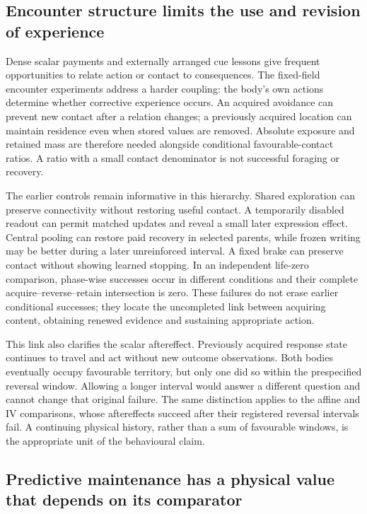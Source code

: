 \subsection*{Encounter structure limits the use and revision of experience}

Dense scalar payments and externally arranged cue lessons give frequent opportunities to relate action or contact to consequences. The fixed-field encounter experiments address a harder coupling: the body's own actions determine whether corrective experience occurs. An acquired avoidance can prevent new contact after a relation changes; a previously acquired location can maintain residence even when stored values are removed. Absolute exposure and retained mass are therefore needed alongside conditional favourable-contact ratios. A ratio with a small contact denominator is not successful foraging or recovery.

The earlier controls remain informative in this hierarchy. Shared exploration can preserve connectivity without restoring useful contact. A temporarily disabled readout can permit matched updates and reveal a small later expression effect. Central pooling can restore paid recovery in selected parents, while frozen writing may be better during a later unreinforced interval. A fixed brake can preserve contact without showing learned stopping. In an independent life-zero comparison, phase-wise successes occur in different conditions and their complete acquire--reverse--retain intersection is zero. These failures do not erase earlier conditional successes; they locate the uncompleted link between acquiring content, obtaining renewed evidence and sustaining appropriate action.

This link also clarifies the scalar aftereffect. Previously acquired response state continues to travel and act without new outcome observations. Both bodies eventually occupy favourable territory, but only one did so within the prespecified reversal window. Allowing a longer interval would answer a different question and cannot change that original failure. The same distinction applies to the affine and IV comparisons, whose aftereffects succeed after their registered reversal intervals fail. A continuing physical history, rather than a sum of favourable windows, is the appropriate unit of the behavioural claim.

\subsection*{Predictive maintenance has a physical value that depends on its comparator}

